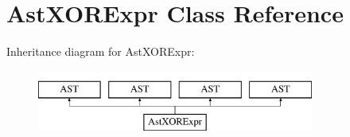 \hypertarget{classAstXORExpr}{\section{Ast\-X\-O\-R\-Expr Class Reference}
\label{classAstXORExpr}
}
Inheritance diagram for Ast\-X\-O\-R\-Expr\-:\begin{figure}[H]
\begin{center}
\leavevmode
\includegraphics[height=2.000000cm]{classAstXORExpr}
\end{center}
\end{figure}

